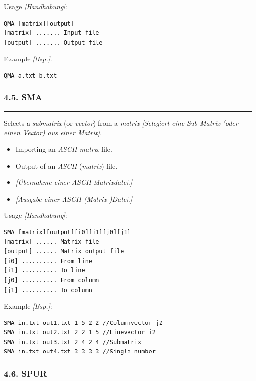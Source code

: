 \documentclass[
]{article}
\begin{document}
Usage \emph{{[}Handhabung{]}}:

\begin{verbatim}
QMA [matrix][output] 
[matrix] ....... Input file 
[output] ....... Output file
\end{verbatim}

Example \emph{{[}Bsp.{]}}:

\begin{verbatim}
QMA a.txt b.txt
\end{verbatim}

\hypertarget{sma}{%
\subsubsection{4.5. SMA}\label{sma}}

\begin{center}\rule{0.5\linewidth}{0.5pt}\end{center}

Selects a \emph{submatrix} (or \emph{vector}) from a \emph{matrix}
\emph{{[}Selegiert eine Sub Matrix (oder einen Vektor) aus einer
Matrix{]}}.

\begin{itemize}
\item
  Importing an \emph{ASCII matrix} file.
\item
  Output of an \emph{ASCII} (\emph{matrix}) file.
\item
  \emph{{[}Übernahme einer ASCII Matrixdatei.{]}}
\item
  \emph{{[}Ausgabe einer ASCII (Matrix-)Datei.{]}}
\end{itemize}

Usage \emph{{[}Handhabung{]}}:

\begin{verbatim}
SMA [matrix][output][i0][i1][j0][j1] 
[matrix] ...... Matrix file 
[output] ...... Matrix output file 
[i0] .......... From line 
[i1] .......... To line 
[j0] .......... From column 
[j1] .......... To column
\end{verbatim}

Example \emph{{[}Bsp.{]}}:

\begin{verbatim}
SMA in.txt out1.txt 1 5 2 2 //Columnvector j2
SMA in.txt out2.txt 2 2 1 5 //Linevector i2
SMA in.txt out3.txt 2 4 2 4 //Submatrix
SMA in.txt out4.txt 3 3 3 3 //Single number
\end{verbatim}

\hypertarget{spur}{%
\subsubsection{4.6. SPUR}\label{spur}}
\end{document}
